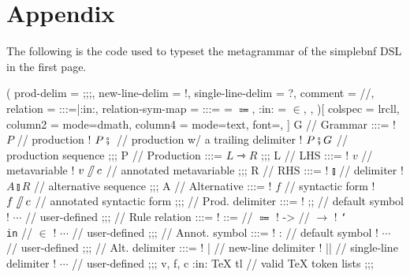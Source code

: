 \documentclass[11pt]{article}
\begin{document}
\section*{Appendix}\label{sec:appendix}
The following is the code used to typeset the metagrammar of the \textsf{simplebnf} DSL in the first page.
\begin{listing}[breakable]
\begin{bnf}(
  prod-delim = ;;;,
  new-line-delim = !,
  single-line-delim = ?,
  comment = //,
  relation = {:::=|:in:},
  relation-sym-map =
    {
      {:::=} = $\Coloneqq$,
      {:in:} = $\in$,
    },
)[
  colspec = lrcll,
  column{2} = {mode=dmath},
  column{4} = {mode=text, font=\ttfamily},
]
  G // Grammar :::=
  ! $P$ // production
  ! $P \fatsemi {}$ // production w/ a trailing delimiter
  ! $P \fatsemi G$ // production sequence
;;;
  P // Production :::= $L \rightarrowtriangle R$
;;;
  L // LHS :::=
  ! $v$ // metavariable
  ! $v\!\fatslash\,c$ // annotated metavariable
;;;
  R // RHS :::=
  ! $\talloblong$ // delimiter
  ! $A \talloblong R$ // alternative sequence
;;;
  A // Alternative :::=
  ! $f$ // syntactic form
  ! $f\!\fatslash\,c$ // annotated syntactic form
;;;
  \fatsemi // Prod. delimiter :::=
  ! ;; // default symbol
  ! $\cdots$ // user-defined
;;;
  \rightarrowtriangle // Rule relation :::=
  ! ::= // $\Coloneqq$
  ! -> // $\to$
  ! \texttt{\char`\\in} // $\in$
  ! $\cdots$ // user-defined
;;;
  \fatslash // Annot. symbol :::=
  ! : // default symbol
  ! $\cdots$ // user-defined
;;;
  \talloblong // Alt. delimiter :::=
  ! | // new-line delimiter
  ! || // single-line delimiter
  ! $\cdots$ // user-defined
;;;
  v, f, c :in: \textsf{\TeX{} tl} // valid \TeX{} token lists
;;;
\end{bnf}
\end{listing}
\end{document}
